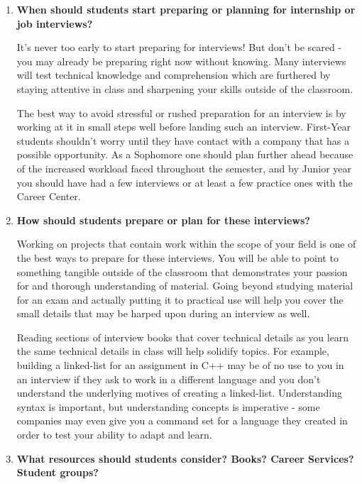 \documentclass[11pt]{article}
\begin{document}
\begin{enumerate}


\item \textbf{When should students start preparing or planning for internship
    or job interviews?}

It's never too early to start preparing for interviews!  But don't be scared -
you may already be preparing right now without knowing.  Many interviews will
        test technical knowledge and comprehension which are furthered by
        staying attentive in class and sharpening your skills outside of the
        classroom.

The best way to avoid stressful or rushed preparation for an interview is by
        working at it in small steps well before landing such an interview.
        First-Year students shouldn't worry until they have contact with a
        company that has a possible opportunity.  As a Sophomore one should
        plan further ahead because of the increased workload faced throughout
        the semester, and by Junior year you should have had a few interviews
        or at least a few practice ones with the Career Center.

\item \textbf{How should students prepare or plan for these interviews?}

Working on projects that contain work within the scope of your field is one of
the best ways to prepare for these interviews.  You will be able to point to
        something tangible outside of the classroom that demonstrates your
        passion for and thorough understanding of material.  Going beyond
        studying material for an exam and actually putting it to practical use
        will help you cover the small details that may be harped upon during an
        interview as well.

Reading sections of interview books that cover technical details as you learn
        the same technical details in class will help solidify topics.  For
        example, building a linked-list for an assignment in C++ may be of no
        use to you in an interview if they ask to work in a different language
        and you don't understand the underlying motives of creating a
        linked-list.  Understanding syntax is important, but understanding
        concepts is imperative - some companies may even give you a command set
        for a language they created in order to test your ability to adapt and
        learn.

\item \textbf{What resources should students consider? Books? Career Services?
    Student groups?}


\end{enumerate}
\end{document}
